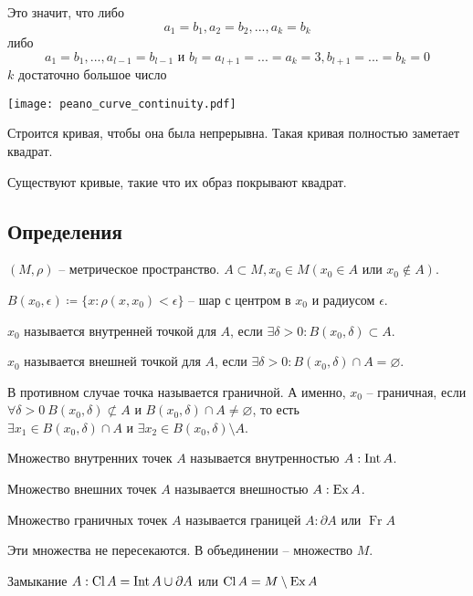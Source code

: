\documentclass[main]{subfiles}
\begin{document}
Это значит, что либо
\[a_1 = b_1, a_2 = b_2, ..., a_k = b_k\]
либо
\[a_1 = b_1,..., a_{l-1} = b_{l-1} \text{ и } b_l= a_{l+1} = ... = a_k =3,  b_{l+1} = ... = b_k =0\]
$k$ достаточно большое число
\begin{center}
    \texttt{[image: peano\_curve\_continuity.pdf]}
\end{center}

Строится кривая, чтобы она была непрерывна. Такая кривая полностью заметает квадрат.

Существуют кривые, такие что их образ покрывают квадрат.

\subsection{Определения}
\begin{definition}
    $(M, \rho)$ -- метрическое пространство. $A \subset M, x_0 \in M (x_0 \in A \text{ или } x_0 \not\in A)$.

    $B(x_0, \epsilon) \coloneqq \{x: \rho(x, x_0) < \epsilon\}$ -- шар с центром в $x_0$ и радиусом $\epsilon$.

    $x_0$ называется внутренней точкой  для $A$, если $\exists \delta>0 : B(x_0, \delta) \subset A$.

    $x_0$ называется внешней точкой  для $A$, если $\exists \delta>0 : B(x_0, \delta) \cap A = \varnothing$.

    В противном случае точка называется граничной.
    А именно, $x_0$ -- граничная, если
    $\forall \delta >0 \ B(x_0, \delta) \not\subset A \text{ и }
        B(x_0, \delta) \cap A \neq \varnothing$, то есть
    $\exists x_1 \in  B(x_0, \delta) \cap A \text{ и }
        \exists x_2 \in B(x_0, \delta) \setminus A$.
\end{definition}

\begin{definition}
    Множество внутренних точек $A$ называется внутренностью $A: \operatorname{Int} A$.

    Множество внешних точек $A$ называется внешностью $A: \operatorname{Ex} A$.

    Множество граничных точек $A$ называется границей $A: \partial A$ или $\operatorname{Fr}A$
\end{definition}
\begin{remark}
    Эти множества не пересекаются. В объединении -- множество $M$.
\end{remark}

\begin{definition}
    Замыкание $A: \operatorname{Cl} A = \operatorname{Int} A \cup \partial A$
    или $\operatorname{Cl} A = M \setminus \operatorname{Ex} A$
\end{definition}
\end{document}
